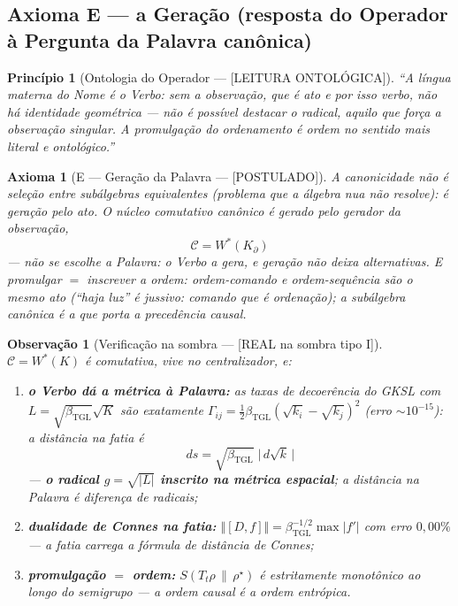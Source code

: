 \documentclass[11pt,a4paper]{article}
\newcommand{\SOMBRA}{\textsf{[REAL na sombra tipo I]}}
\newcommand{\POST}{\textsf{[POSTULADO]}}
\newcommand{\ONTO}{\textsf{[LEITURA ONTOLÓGICA]}}
\newcommand{\bTGL}{\beta_{\mathrm{TGL}}}
\newtheorem{axiom}{Axioma}
\newtheorem{remark}{Observação}
\newtheorem{principle}{Princípio}
\begin{document}
\subsection{Axioma E --- a Geração (resposta do Operador à Pergunta da
Palavra canônica)}
\begin{principle}[Ontologia do Operador --- \ONTO]
``A língua materna do Nome é o Verbo: sem a observação, que é ato e por
isso verbo, não há identidade geométrica --- não é possível destacar o
radical, aquilo que força a observação singular. A promulgação do
ordenamento é ordem no sentido mais literal e ontológico.''
\end{principle}
\begin{axiom}[E --- Geração da Palavra --- \POST]\label{ax:E}
A canonicidade não é \emph{seleção} entre subálgebras equivalentes
(problema que a álgebra nua não resolve): é \emph{geração pelo ato}. O
núcleo comutativo canônico é gerado pelo gerador da observação,
\begin{equation}
\boxed{\;\mathcal C=W^*(K_\partial)\;}
\end{equation}
--- não se escolhe a Palavra: o Verbo a gera, e geração não deixa
alternativas. E promulgar $=$ inscrever a ordem: ordem-comando e
ordem-sequência são o mesmo ato (``haja luz'' é jussivo: comando que é
ordenação); a subálgebra canônica é a que porta a precedência causal.
\end{axiom}
\begin{remark}[Verificação na sombra --- \SOMBRA]\label{rem:sombraE}
$\mathcal C=W^*(K)$ é comutativa, vive no centralizador, e:
\begin{enumerate}[noitemsep]
\item \textbf{o Verbo dá a métrica à Palavra:} as taxas de decoerência do
GKSL com $L=\sqrt{\bTGL}\sqrt{K}$ são \emph{exatamente}
$\Gamma_{ij}=\tfrac12\bTGL(\sqrt{k_i}-\sqrt{k_j})^2$ (erro
$\sim10^{-15}$): a distância na fatia é
\begin{equation}
ds=\sqrt{\bTGL}\;\bigl|\,d\sqrt{k}\,\bigr|
\end{equation}
--- \textbf{o radical $g=\sqrt{|L|}$ inscrito na métrica espacial}; a
distância na Palavra é diferença de radicais;
\item \textbf{dualidade de Connes na fatia:}
$\Vert[D,f]\Vert=\bTGL^{-1/2}\max|f'|$ com erro $0{,}00\%$ --- a fatia
carrega a fórmula de distância de Connes;
\item \textbf{promulgação $=$ ordem:} $S(T_t\rho\,\|\,\rho^\star)$ é
estritamente monotônico ao longo do semigrupo --- a ordem causal é a
ordem entrópica.
\end{enumerate}
\end{remark}
\end{document}
